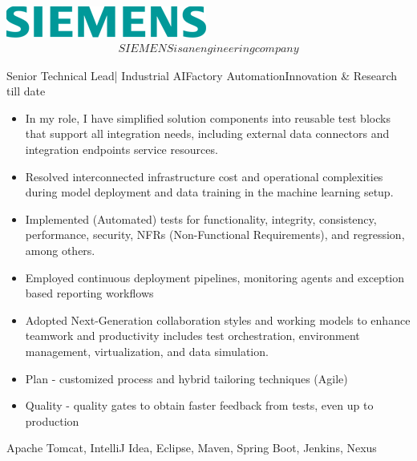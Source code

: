 %
%
%
    \right
    \includegraphics[width=0.10\linewidth]{sie.png}
\begin{multline}
SIEMENS is an engineering company
\end{multline} 
\begin{experiences}     
     {Senior Technical Lead| Industrial AI}{Factory Automation}{Innovation \& Research}
    {till date} {\begin{itemize}
                        \item In my role, I have simplified solution components into reusable test blocks that support all integration needs, including external data connectors and integration endpoints service resources.
                        \item Resolved interconnected infrastructure cost and operational complexities during model deployment and data training in the machine learning setup.
                        \item Implemented (Automated) tests for functionality, integrity, consistency, performance, security, NFRs (Non-Functional Requirements), and regression, among others.
                        \item Employed continuous deployment pipelines, monitoring agents and exception based reporting workflows
                        \item Adopted Next-Generation collaboration styles and working models to enhance teamwork and productivity includes test orchestration, environment management, virtualization, and data simulation.
                        \item Plan - customized process and hybrid tailoring techniques (Agile)
                        \item Quality - quality gates to obtain faster feedback from tests, even up to production
                    \end{itemize}
                    }
                    {Apache Tomcat, IntelliJ Idea, Eclipse, Maven, Spring Boot, Jenkins, Nexus}
  \emptySeparator

\end{experiences}
